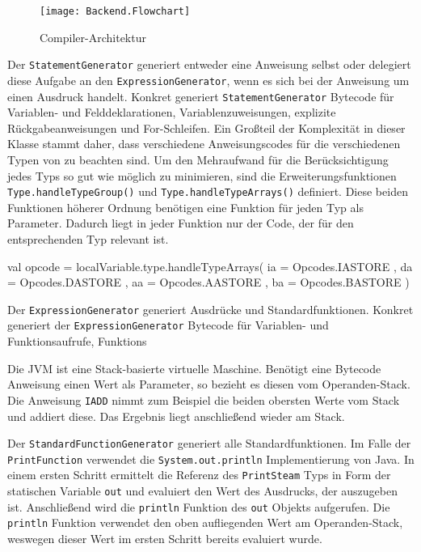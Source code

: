 \begin{figure}[h]
    \caption{Compiler-Architektur}
    \centering
    \texttt{[image: Backend.Flowchart]}
    \label{fig:compiler-architecture}
\end{figure}

Der \texttt{StatementGenerator} generiert entweder eine Anweisung selbst oder delegiert diese Aufgabe an den \texttt{ExpressionGenerator}, wenn es sich bei der Anweisung um einen Ausdruck handelt. Konkret generiert \texttt{StatementGenerator} Bytecode für Variablen- und Felddeklarationen, Variablenzuweisungen, explizite Rückgabeanweisungen und For-Schleifen. Ein Großteil der Komplexität in dieser Klasse stammt daher, dass verschiedene Anweisungscodes für die verschiedenen Typen von \toya zu beachten sind. Um den Mehraufwand für die Berücksichtigung jedes Typs so gut wie möglich zu minimieren, sind die Erweiterungsfunktionen \texttt{Type.handleTypeGroup()} und \texttt{Type.handleTypeArrays()} definiert. Diese beiden Funktionen höherer Ordnung benötigen eine Funktion für jeden Typ als Parameter. Dadurch liegt in jeder Funktion nur der Code, der für den entsprechenden Typ relevant ist.

\begin{KotlinCode}[numbers=none, caption={Die Erweiterungsfunktion \texttt{Type.handleTypeArrays} in Verwendung, um den richtigen Anweisungscode zu ermitteln.}]
val opcode = localVariable.type.handleTypeArrays(
    ia = { Opcodes.IASTORE },
    da = { Opcodes.DASTORE },
    aa = { Opcodes.AASTORE },
    ba = { Opcodes.BASTORE }
)
\end{KotlinCode}

Der \texttt{ExpressionGenerator} generiert Ausdrücke und Standardfunktionen. Konkret generiert der \texttt{ExpressionGenerator} Bytecode für Variablen- und Funktionsaufrufe, Funktions



Die JVM ist eine Stack-basierte virtuelle Maschine. Benötigt eine Bytecode Anweisung einen Wert als Parameter, so bezieht es diesen vom Operanden-Stack. Die Anweisung \texttt{IADD} nimmt zum Beispiel die beiden obersten Werte vom Stack und addiert diese. Das Ergebnis liegt anschließend wieder am Stack.



Der \texttt{StandardFunctionGenerator} generiert alle Standardfunktionen. Im Falle der \texttt{PrintFunction} verwendet \toya die \texttt{System.out.println} Implementierung von Java. In einem ersten Schritt ermittelt \toya die Referenz des \texttt{PrintSteam} Typs in Form der statischen Variable \texttt{out} und evaluiert \toya den Wert des Ausdrucks, der auszugeben ist. Anschließend wird die \texttt{println} Funktion des \texttt{out} Objekts aufgerufen. Die \texttt{println} Funktion verwendet den oben aufliegenden Wert am Operanden-Stack, weswegen dieser Wert im ersten Schritt bereits evaluiert wurde.

